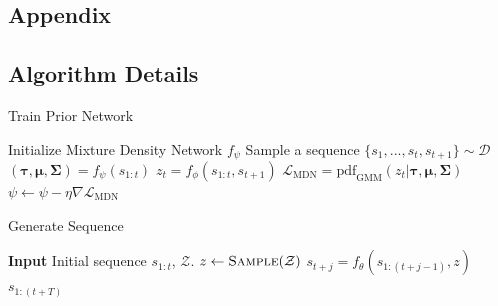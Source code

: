 \documentclass{article}
\begin{document}
%

\newpage




\newpage

\begin{appendices}
\section{Appendix}


\subsection{Algorithm Details}

\begin{minipage}[t]{7cm}
  \vspace{0pt}

  \begin{algorithm}[H]
    \caption{Train Prior Network}
    \begin{algorithmic}[1]
    \State Initialize Mixture Density Network $f_\psi$
    \State Sample a sequence $\{s_1, ..., s_t, s_{t+1}\} \sim \mathcal{D}$
    \State $(\bm{\tau}, \bm{\mu}, \bm{\Sigma}) = f_{\psi}(s_{1:t})$
    \State $z_t = f_{\phi}(s_{1:t}, s_{t+1})$
      \State $\mathcal{L}_\text{MDN} = \text{pdf}_\text{GMM}(z_t | \bm{\tau}, \bm{\mu}, \bm{\Sigma})$\footnotemark
    \State $\psi \gets \psi - \eta \nabla \mathcal{L}_\text{MDN}$
    \EndWhile
  \end{algorithmic}
  \end{algorithm}
\end{minipage}%
\begin{minipage}[t]{7cm}
  \vspace{0pt}

\begin{algorithm}[H]
  \caption{Generate Sequence}\label{algo-sample}
  \begin{algorithmic}[1]
    \State \textbf{Input} Initial sequence $s_{1:t}$, $\mathcal{Z}$.
    \State $z \gets \textsc{Sample}(\mathcal{Z})$
    \State $s_{t+j} = f_\theta(s_{1:(t+j-1)}, z)$
    \EndFor
    \Return $s_{1:(t+T)}$
    \State
    \State
    \State
    \State
  \end{algorithmic}
\end{algorithm}
\end{minipage}



\end{appendices}
\end{document}
